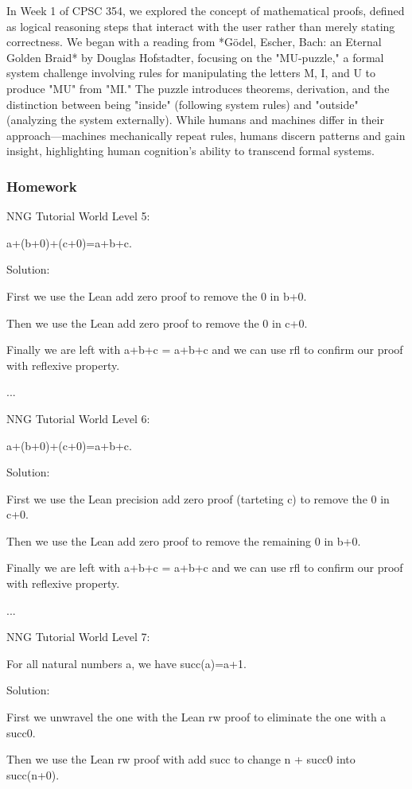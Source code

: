\documentclass{article}
\theoremstyle{theorem}
\theoremstyle{definition}
\theoremstyle{remark}
\begin{document}
In Week 1 of CPSC 354, we explored the concept of mathematical proofs, defined as logical reasoning steps that interact with the user rather than merely stating correctness. We began with a reading from *Gödel, Escher, Bach: an Eternal Golden Braid* by Douglas Hofstadter, focusing on the "MU-puzzle," a formal system challenge involving rules for manipulating the letters M, I, and U to produce "MU" from "MI." The puzzle introduces theorems, derivation, and the distinction between being "inside" (following system rules) and "outside" (analyzing the system externally). While humans and machines differ in their approach—machines mechanically repeat rules, humans discern patterns and gain insight, highlighting human cognition's ability to transcend formal systems.
\subsubsection*{Homework}

NNG Tutorial World Level 5:

a+(b+0)+(c+0)=a+b+c.

Solution: 

First we use the Lean add zero proof to remove the 0 in b+0.

Then we use the Lean add zero proof to remove the 0 in c+0.

Finally we are left with a+b+c = a+b+c and we can use rfl to confirm our proof with reflexive property.

...

NNG Tutorial World Level 6:

a+(b+0)+(c+0)=a+b+c.

Solution: 

First we use the Lean precision add zero proof (tarteting c) to remove the 0 in c+0.

Then we use the Lean add zero proof to remove the remaining 0 in b+0.

Finally we are left with a+b+c = a+b+c and we can use rfl to confirm our proof with reflexive property.

...

NNG Tutorial World Level 7:

For all natural numbers a, we have succ(a)=a+1.

Solution: 

First we unwravel the one with the Lean rw proof to eliminate the one with a succ0.

Then we use the Lean rw proof with add succ to change n + succ0 into succ(n+0).
\end{document}
